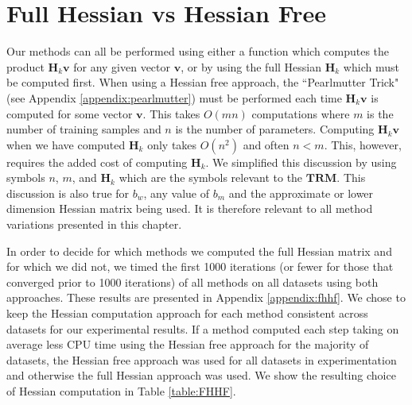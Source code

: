 \documentclass[letterpaper,12pt,titlepage,oneside,final]{book}
\begin{document}
	\section{Full Hessian vs Hessian Free}
	
	Our methods can all be performed using either a function which computes the product $\mathbf{H}_{k}\mathbf{v}$ for any given vector $\mathbf{v}$, or by using the full Hessian $\mathbf{H}_{k}$ which must be computed first. When using a Hessian free approach, the ``Pearlmutter Trick" (see Appendix \ref{appendix:pearlmutter}) must be performed each time $\mathbf{H}_{k}\mathbf{v}$ is computed for some vector $\mathbf{v}$. This takes $O(mn)$ computations where $m$ is the number of training samples and $n$ is the number of parameters. Computing $\mathbf{H}_{k}\mathbf{v}$ when we have computed $\mathbf{H}_{k}$ only takes $O(n^{2})$ and often $n < m$. This, however, requires the added cost of computing $\mathbf{H}_{k}$. We simplified this discussion by using symbols $n$, $m$, and $\mathbf{H}_{k}$ which are the symbols relevant to the $\mathbf{TRM}$. This discussion is also true for $b_{w}$, any value of $b_{m}$ and the approximate or lower dimension Hessian matrix being used. It is therefore relevant to all method variations presented in this chapter.
	
	In order to decide for which methods we computed the full Hessian matrix and for which we did not, we timed the first 1000 iterations (or fewer for those that converged prior to 1000 iterations) of all methods on all datasets using both approaches. These results are presented in Appendix \ref{appendix:fhhf}.  We chose to keep the Hessian computation approach for each method consistent across datasets for our experimental results. If a method computed each step taking on average less CPU time using the Hessian free approach for the majority of datasets, the Hessian free approach was used for all datasets in experimentation and otherwise the full Hessian approach was used. We show the resulting choice of Hessian computation in Table \ref{table:FHHF}. 
	
\end{document}
